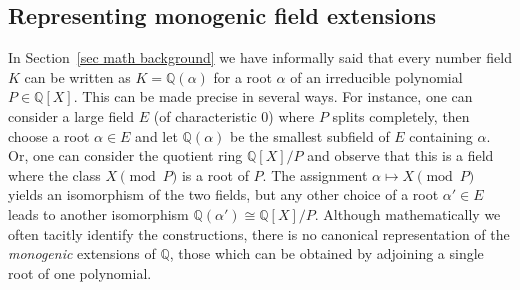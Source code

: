 \documentclass[a4paper,USenglish,cleveref, autoref, thm-restate]{lipics-v2021}
\newcommand{\lean}[1]{\texttt{#1}\xspace} %
\newcommand{\mathlib}{\textsf{mathlib}\xspace}
\newcommand{\Q}{\mathbb{Q}}
\newcommand{\Z}{\mathbb{Z}}
\begin{document}
%
%
%
%
%
%
%

\subsection{Representing monogenic field extensions} \label{sec:monogenic-field-extension}

In Section~\ref{sec math background} we have informally said that every number field $K$ can be written as $K=\Q(\alpha)$ for a root $\alpha$ of an irreducible polynomial $P\in\Q[X]$. This can be made precise in several ways. For instance, one can consider a large field $E$ (of characteristic $0$) where $P$ splits completely, then choose a root $\alpha\in E$ and let $\Q(\alpha)$ be the smallest subfield of $E$ containing $\alpha$. Or, one can consider the quotient ring $\Q[X]/P$ and observe that this is a field where the class $X\pmod{P}$ is a root of $P$. The assignment $\alpha\mapsto X\pmod{P}$ yields an isomorphism of the two fields, but any other choice of a root $\alpha'\in E$ leads to another isomorphism $\Q(\alpha')\cong \Q[X]/P$. Although mathematically we often tacitly identify the constructions, there is no canonical representation of the \emph{monogenic} extensions of $\Q$, those which can be obtained by adjoining a single root of one polynomial.
\end{document}
